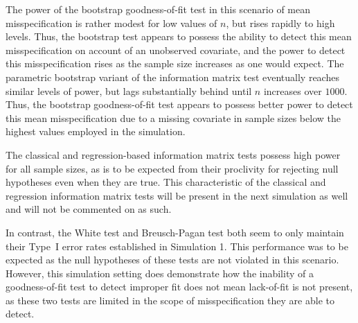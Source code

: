 \documentclass[12pt]{article} %
\theoremstyle{definition}
\begin{document}
\begin{table}[H]
	\centering
	\small\addtolength{\tabcolsep}{-3pt}
	\setlength\extrarowheight{-3pt}
	{
	}
	\end{table}

The power of the bootstrap goodness-of-fit test in this scenario of mean misspecification is rather modest for low values of $n$, but rises rapidly to high levels. Thus, the bootstrap test appears to possess the
ability to detect this mean misspecification on account of an unobserved covariate, and the power to detect this misspecification rises as the sample size increases as one would expect.
The parametric bootstrap variant of the information matrix test eventually reaches similar levels of power, but lags substantially behind until $n$ increases over $1000$. Thus, the bootstrap
goodness-of-fit test appears to possess better power to detect this mean misspecification due to a missing covariate in sample sizes below the highest values employed in the simulation.

The classical and regression-based information matrix tests possess high power for all sample sizes, as is to be expected from their proclivity for rejecting null hypotheses even when they are true.
This characteristic of the classical and regression information matrix tests will be present in the next simulation as well and will not be commented on as such. 

In contrast, the White test and Breusch-Pagan test both seem to only maintain their Type~I error rates established in Simulation 1. This performance was to be expected
as the null hypotheses of these tests are not violated in this scenario. However, this simulation setting does demonstrate how the inability of a goodness-of-fit test to detect improper
fit does not mean lack-of-fit is not present, as these two tests are limited in the scope of misspecification they are able to detect.
\end{document}
